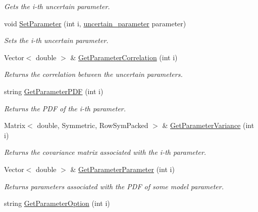 \documentclass{tufte-book}
\begin{document}
\begin{DoxyCompactItemize}
\begin{DoxyCompactList}\small\item\em \-Gets the i-\/th uncertain parameter. \end{DoxyCompactList}\item
void \hyperlink{class_verdandi_1_1_model_template_a3f8b06eb70e68eec3e110a87a89ff988}{\-Set\-Parameter} (int i, \hyperlink{class_verdandi_1_1_model_template_ac387d42c1587d4a9c9b15682de1a5741}{uncertain\-\_\-parameter} parameter)
\begin{DoxyCompactList}\small\item\em \-Sets the i-\/th uncertain parameter. \end{DoxyCompactList}\item
\-Vector$<$ double $>$ \& \hyperlink{class_verdandi_1_1_model_template_a29a7935dc36751fb73685b4e74684859}{\-Get\-Parameter\-Correlation} (int i)
\begin{DoxyCompactList}\small\item\em \-Returns the correlation between the uncertain parameters. \end{DoxyCompactList}\item
string \hyperlink{class_verdandi_1_1_model_template_a06e4708e75e1d6ac65d0e13e0e7a1e2b}{\-Get\-Parameter\-P\-D\-F} (int i)
\begin{DoxyCompactList}\small\item\em \-Returns the \-P\-D\-F of the i-\/th parameter. \end{DoxyCompactList}\item
\-Matrix$<$ double, \-Symmetric, \*
\-Row\-Sym\-Packed $>$ \& \hyperlink{class_verdandi_1_1_model_template_ac83908d647612b292ef3f633bc245609}{\-Get\-Parameter\-Variance} (int i)
\begin{DoxyCompactList}\small\item\em \-Returns the covariance matrix associated with the i-\/th parameter. \end{DoxyCompactList}\item
\-Vector$<$ double $>$ \& \hyperlink{class_verdandi_1_1_model_template_a2f247a7e524aa3cacfe789b14f4603e9}{\-Get\-Parameter\-Parameter} (int i)
\begin{DoxyCompactList}\small\item\em \-Returns parameters associated with the \-P\-D\-F of some model parameter. \end{DoxyCompactList}\item
string \hyperlink{class_verdandi_1_1_model_template_a94f9838475042455debb9a72333e8780}{\-Get\-Parameter\-Option} (int i)

\end{DoxyCompactItemize}
\end{document}
